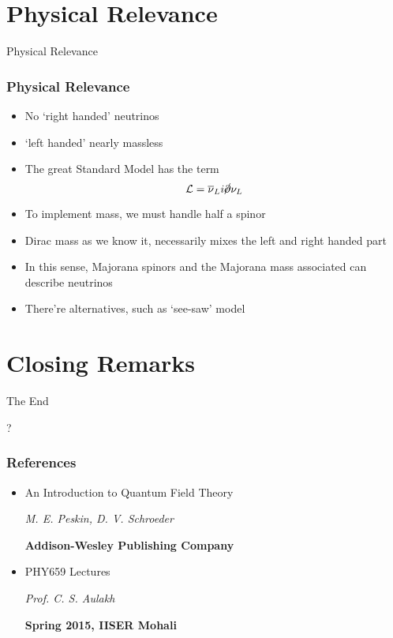 \documentclass{beamer}
\begin{document}
 








\section{Physical Relevance}
\begin{frame}	
	\Huge{\centerline{Physical Relevance}}
\end{frame}

 
\begin{frame}
	\frametitle{Physical Relevance}
	\begin{itemize}
		\item No `right handed' neutrinos
		\pause
		\item `left handed' nearly massless
		\pause
		\item The great Standard Model has the term 
		\pause
\[
\mathcal{L}=\overline{\nu}_{L}i\cancel{\partial}\nu_{L}
\]
		\item To implement mass, we must handle half a spinor
		\pause
		\item Dirac mass as we know it, necessarily mixes the left and right handed part
		\pause
		\item In this sense, Majorana spinors and the Majorana mass associated can describe neutrinos
		\pause
		\item There're alternatives, such as `see-saw' model

	\end{itemize}
\end{frame}




\section{Closing Remarks}
	\begin{frame}
	\Huge{\centerline{The End}}
	\end{frame}

	\begin{frame}
	\Huge{\centerline{?}}
	\end{frame}

\begin{frame}
	\frametitle{References}
	\begin{itemize}
		\item An Introduction to Quantum Field Theory 

		\emph{M. E. Peskin, D. V. Schroeder} 

		\textbf{Addison-Wesley Publishing Company}
		\item PHY659 Lectures

		\emph{Prof. C. S. Aulakh}

		\textbf{Spring 2015, IISER Mohali}
	\end{itemize}

\end{frame}
\end{document}
